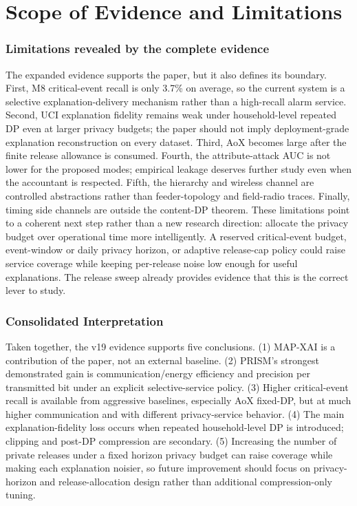 \documentclass[11pt]{article}
\newcommand{\MAP}{MAP-XAI}
\begin{document}
\part{Scope of Evidence and Limitations}
\section{Limitations revealed by the complete evidence}
The expanded evidence supports the paper, but it also defines its boundary. First, M8 critical-event recall is only 3.7\% on average, so the current system is a selective explanation-delivery mechanism rather than a high-recall alarm service. Second, UCI explanation fidelity remains weak under household-level repeated DP even at larger privacy budgets; the paper should not imply deployment-grade explanation reconstruction on every dataset. Third, AoX becomes large after the finite release allowance is consumed. Fourth, the attribute-attack AUC is not lower for the proposed modes; empirical leakage deserves further study even when the accountant is respected. Fifth, the hierarchy and wireless channel are controlled abstractions rather than feeder-topology and field-radio traces. Finally, timing side channels are outside the content-DP theorem.
These limitations point to a coherent next step rather than a new research direction: allocate the privacy budget over operational time more intelligently. A reserved critical-event budget, event-window or daily privacy horizon, or adaptive release-cap policy could raise service coverage while keeping per-release noise low enough for useful explanations. The release sweep already provides evidence that this is the correct lever to study.

\section{Consolidated Interpretation}
Taken together, the v19 evidence supports five conclusions. (1) \MAP{} is a contribution of the paper, not an external baseline. (2) PRISM's strongest demonstrated gain is communication/energy efficiency and precision per transmitted bit under an explicit selective-service policy. (3) Higher critical-event recall is available from aggressive baselines, especially AoX fixed-DP, but at much higher communication and with different privacy-service behavior. (4) The main explanation-fidelity loss occurs when repeated household-level DP is introduced; clipping and post-DP compression are secondary. (5) Increasing the number of private releases under a fixed horizon privacy budget can raise coverage while making each explanation noisier, so future improvement should focus on privacy-horizon and release-allocation design rather than additional compression-only tuning.
\end{document}
